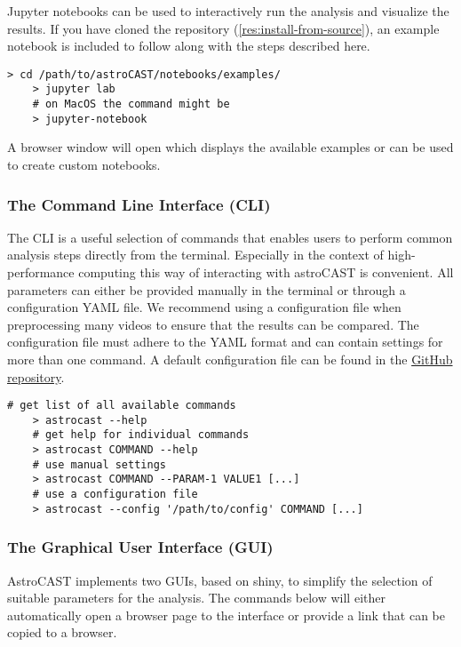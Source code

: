 Jupyter notebooks can be used to interactively run the analysis and visualize the results.
If you have cloned the repository (\ref{res:install-from-source}), an example notebook is included to follow along with the steps described here.

\begin{lstlisting}[style=bashStyle]
    > cd /path/to/astroCAST/notebooks/examples/
    > jupyter lab
    # on MacOS the command might be
    > jupyter-notebook
\end{lstlisting}

A browser window will open which displays the available examples or can be used to create custom notebooks.

\subsubsection{The Command Line Interface (CLI)}

The \ac{CLI} is a useful selection of commands that enables users to perform common analysis steps directly from the terminal. Especially in the context of high-performance computing this way of interacting with astroCAST is convenient. All parameters can either be provided manually in the terminal or through a configuration YAML file. We recommend using a configuration file when preprocessing many videos to ensure that the results can be compared. The configuration file must adhere to the YAML format and can contain settings for more than one command. A default configuration file can be found in the \href{https://github.com/janreising/astroCAST/blob/3ad41d03068732419df7fdde9b2a0f449898d4e2/config.yaml}{GitHub repository}.

\begin{lstlisting}[style=bashStyle]
    # get list of all available commands
    > astrocast --help
    # get help for individual commands
    > astrocast COMMAND --help
    # use manual settings
    > astrocast COMMAND --PARAM-1 VALUE1 [...]
    # use a configuration file
    > astrocast --config '/path/to/config' COMMAND [...]
\end{lstlisting}

\subsubsection{The Graphical User Interface (GUI)}

AstroCAST implements two \ac{GUI}s, based on shiny\citep{chang_shiny_2024}, to simplify the selection of suitable parameters for the analysis. The commands below will either automatically open a browser page to the interface or provide a link that can be copied to a browser.

